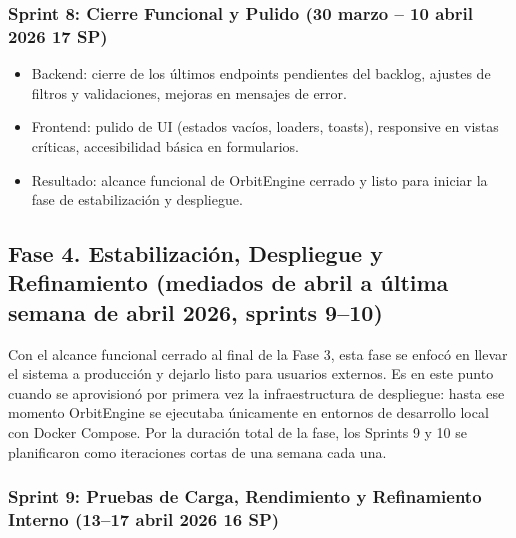 \subsubsection{Sprint 8: Cierre Funcional y Pulido (30 marzo -- 10 abril 2026 \textbar{} 17 SP)}\label{sprint-8-cierre-funcional-y-pulido-30-marzo-10-abril-2026-17-sp}

\begin{itemize}
\tightlist
\item
  Backend: cierre de los últimos endpoints pendientes del backlog, ajustes de filtros y validaciones, mejoras en mensajes de error.
\item
  Frontend: pulido de UI (estados vacíos, loaders, toasts), responsive en vistas críticas, accesibilidad básica en formularios.
\item
  Resultado: alcance funcional de OrbitEngine cerrado y listo para iniciar la fase de estabilización y despliegue.
\end{itemize}

\subsection{Fase 4. Estabilización, Despliegue y Refinamiento (mediados de abril a última semana de abril 2026, sprints 9--10)}\label{fase-4.-estabilizaciuxf3n-despliegue-y-refinamiento-mediados-de-abril-a-uxfaltima-semana-de-abril-2026-sprints-910}

Con el alcance funcional cerrado al final de la Fase 3, esta fase se enfocó en llevar el sistema a producción y dejarlo listo para usuarios externos. Es en este punto cuando se aprovisionó por primera vez la infraestructura de despliegue: hasta ese momento OrbitEngine se ejecutaba únicamente en entornos de desarrollo local con Docker Compose. Por la duración total de la fase, los Sprints 9 y 10 se planificaron como iteraciones cortas de una semana cada una.

\subsubsection{Sprint 9: Pruebas de Carga, Rendimiento y Refinamiento Interno (13--17 abril 2026 \textbar{} 16 SP)}\label{sprint-9-pruebas-de-carga-rendimiento-y-refinamiento-interno-1317-abril-2026-16-sp}

